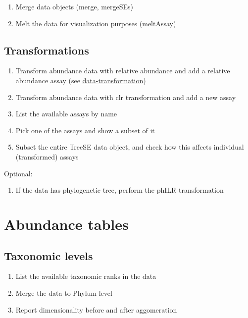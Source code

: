 \documentclass[
]{book}
\providecommand{\tightlist}{%
  \setlength{\itemsep}{0pt}\setlength{\parskip}{0pt}}
\begin{document}
\begin{enumerate}
\def\labelenumi{\arabic{enumi}.}
\tightlist
\item
  Merge data objects (merge, mergeSEs)
\item
  Melt the data for visualization purposes (meltAssay)
\end{enumerate}

\hypertarget{transformations}{%
\subsection{Transformations}\label{transformations}}

\begin{enumerate}
\def\labelenumi{\arabic{enumi}.}
\tightlist
\item
  Transform abundance data with relative abundance and add a relative abundance assay (see \href{https://microbiome.github.io/OMA/taxonomic-information.html\#data-transformation}{data-transformation})
\item
  Transform abundance data with clr transformation and add a new assay
\item
  List the available assays by name
\item
  Pick one of the assays and show a subset of it
\item
  Subset the entire TreeSE data object, and check how this affects individual (transformed) assays
\end{enumerate}

Optional:

\begin{enumerate}
\def\labelenumi{\arabic{enumi}.}
\setcounter{enumi}{5}
\tightlist
\item
  If the data has phylogenetic tree, perform the phILR transformation
\end{enumerate}

\hypertarget{abundance-tables}{%
\section{Abundance tables}\label{abundance-tables}}

\hypertarget{taxonomic-levels}{%
\subsection{Taxonomic levels}\label{taxonomic-levels}}

\begin{enumerate}
\def\labelenumi{\arabic{enumi}.}
\tightlist
\item
  List the available taxonomic ranks in the data
\item
  Merge the data to Phylum level
\item
  Report dimensionality before and after aggomeration
\end{enumerate}
\end{document}
